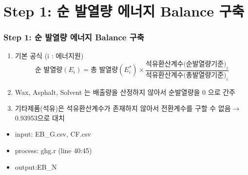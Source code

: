 \documentclass[10pt,compress,slidetop,%
			   hyperref={unicode},xcolor={svgnames},%
			   t]{beamer}
\begin{document}
\section{Step 1: 순 발열량 에너지 Balance 구축}
%
\begin{frame}
	\frametitle{Step 1: 순 발열량 에너지 Balance 구축}
	\begin{enumerate}
	\item{기본 공식 (i : 에너지원)}
	\begin{displaymath}
	\mbox{순 발열량} (E_i) =\mbox{총 발열량} (E^*_i) \times\frac{\mbox{석유환산계수(순발열량기준)}_i}{\mbox{석유환산계수(총발열량기준)}_i}
	\end{displaymath}
	
	\item{ Wax, Asphalt, Solvent 는 배출량을 산정하지 않아서 순발열량을 0 으로 간주}
    \bigskip
	\item{ 기타제품(석유)은 석유환산계수가 존재하지 않아서 전환계수를 구할 수 없음$\rightarrow$ 0.93953으로 대치}
	\end{enumerate}
	
	\begin{itemize}
	\item{input: EB\_G.csv, CF.csv}
	\item{process: ghg.r (line 40:45)}
	\item{output:EB\_N}
	\end{itemize}
	
\end{frame}

%
\end{document}
